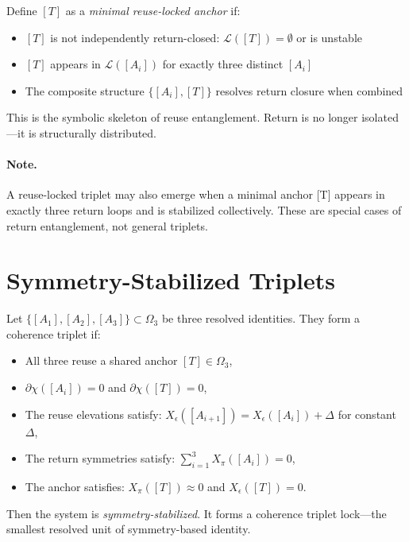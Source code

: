 Define $[T]$ as a \textit{minimal reuse-locked anchor} if:

\begin{itemize}
  \item $[T]$ is not independently return-closed: $\mathcal{L}([T]) = \emptyset$ or is unstable
  \item $[T]$ appears in $\mathcal{L}([A_i])$ for exactly three distinct $[A_i]$
  \item The composite structure $\{ [A_i], [T] \}$ resolves return closure when combined
\end{itemize}

This is the symbolic skeleton of reuse entanglement.  
Return is no longer isolated—it is structurally distributed.

\paragraph{Note.} A reuse-locked triplet may also emerge when a minimal anchor [T] appears in exactly three return loops and is stabilized collectively. These are special cases of return entanglement, not general triplets.

\section{Symmetry-Stabilized Triplets} \label{symmetry-stabilized-triplets}

\begin{definition}
Let $\{[A_1], [A_2], [A_3]\} \subset \Omega_3$ be three resolved identities. They form a coherence triplet if:

\begin{itemize}
  \item All three reuse a shared anchor $[T] \in \Omega_3$,
  \item $\partial \chi([A_i]) = 0$ and $\partial \chi([T]) = 0$,
  \item The reuse elevations satisfy: $X_\epsilon([A_{i+1}]) = X_\epsilon([A_i]) + \Delta$ for constant $\Delta$,
  \item The return symmetries satisfy: $\sum_{i=1}^3 X_\pi([A_i]) = 0$,
  \item The anchor satisfies: $X_\pi([T]) \approx 0$ and $X_\epsilon([T]) = 0$.
\end{itemize}
\end{definition}

Then the system is \textit{symmetry-stabilized}.  
It forms a coherence triplet lock—the smallest resolved unit of symmetry-based identity.

